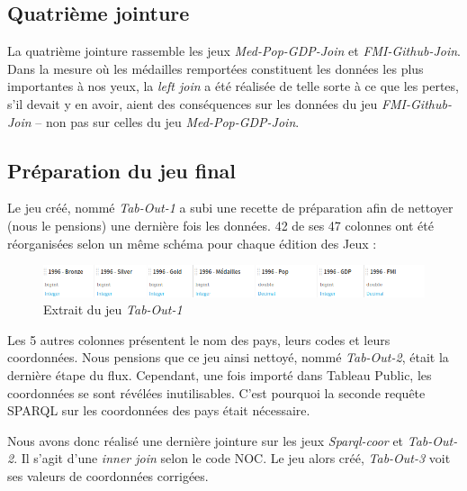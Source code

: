 \documentclass[hidelinks, 12pt]{report}
\begin{document}
%





\subsection{Quatrième jointure}

La quatrième jointure rassemble les jeux \textit{Med-Pop-GDP-Join} et \textit{FMI-Github-Join}. Dans la mesure où les médailles remportées constituent les données les plus importantes à nos yeux, la \textit{left join} a été réalisée de telle sorte à ce que les pertes, s'il devait y en avoir, aient des conséquences sur les données du jeu \textit{FMI-Github-Join} -- non pas sur celles du jeu \textit{Med-Pop-GDP-Join}.





%





\subsection{Préparation du jeu final}

Le jeu créé, nommé \textit{Tab-Out-1} a subi une recette de préparation afin de nettoyer (nous le pensions) une dernière fois les données. \label{orga}42 de ses 47 colonnes ont été réorganisées selon un même schéma pour chaque édition des Jeux :

\begin{center}
	\begin{figure}[H]
		\centering
		\setlength{\belowcaptionskip}{-35pt}
		\includegraphics[scale=0.5]{images/tab-out.png}
		\caption{Extrait du jeu \textit{Tab-Out-1}}
	\end{figure}
\end{center}

Les 5 autres colonnes présentent le nom des pays, leurs codes et leurs coordonnées. Nous pensions que ce jeu ainsi nettoyé, nommé \textit{Tab-Out-2}, était la dernière étape du flux. Cependant, une fois importé dans Tableau Public, les coordonnées se sont révélées inutilisables. C'est pourquoi la seconde requête SPARQL sur les coordonnées des pays était nécessaire. 

Nous avons donc réalisé une dernière jointure sur les jeux \textit{Sparql-coor} et \textit{Tab-Out-2}. Il s'agit d'une \textit{inner join} selon le code NOC. Le jeu alors créé, \textit{Tab-Out-3} voit ses valeurs de coordonnées corrigées.
\end{document}
